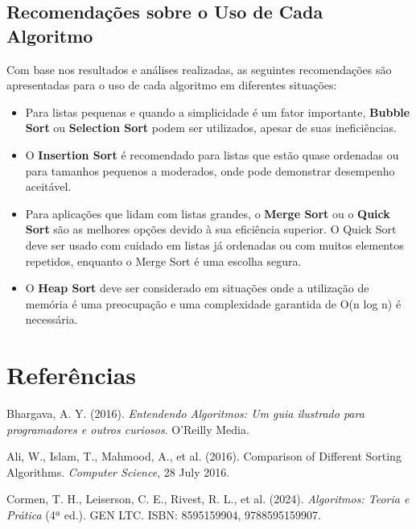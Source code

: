 \documentclass[a4paper,12pt]{article}
\begin{document}
\subsection{Recomendações sobre o Uso de Cada Algoritmo}

Com base nos resultados e análises realizadas, as seguintes recomendações são apresentadas para o uso de cada algoritmo em diferentes situações:

\begin{itemize}
    \item Para listas pequenas e quando a simplicidade é um fator importante, \textbf{Bubble Sort} ou \textbf{Selection Sort} podem ser utilizados, apesar de suas ineficiências.
    
    \item O \textbf{Insertion Sort} é recomendado para listas que estão quase ordenadas ou para tamanhos pequenos a moderados, onde pode demonstrar desempenho aceitável.
    
    \item Para aplicações que lidam com listas grandes, o \textbf{Merge Sort} ou o \textbf{Quick Sort} são as melhores opções devido à sua eficiência superior. O Quick Sort deve ser usado com cuidado em listas já ordenadas ou com muitos elementos repetidos, enquanto o Merge Sort é uma escolha segura.
    
    \item O \textbf{Heap Sort} deve ser considerado em situações onde a utilização de memória é uma preocupação e uma complexidade garantida de O(n log n) é necessária.
\end{itemize}

\section{Referências}

\begin{thebibliography}{99}

Bhargava, A. Y. (2016). \textit{Entendendo Algoritmos: Um guia ilustrado para programadores e outros curiosos}. O'Reilly Media.

Ali, W., Islam, T., Mahmood, A., et al. (2016). Comparison of Different Sorting Algorithms. \textit{Computer Science}, 28 July 2016.

Cormen, T. H., Leiserson, C. E., Rivest, R. L., et al. (2024). \textit{Algoritmos: Teoria e Prática} (4ª ed.). GEN LTC. ISBN: 8595159904, 9788595159907.

\end{thebibliography}
\end{document}
